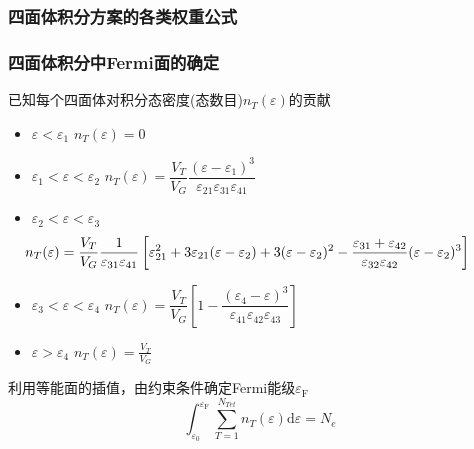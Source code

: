 \subsubsection{四面体积分方案的各类权重公式}
\frame
{
	\frametitle{四面体积分中\textrm{Fermi}面的确定}
	已知每个四面体对积分态密度(态数目)$n_T(\varepsilon)$的贡献
	\begin{itemize}
	\item $\varepsilon<\varepsilon_1$
		\:	$n_T(\varepsilon)=0$
	\item $\varepsilon_1<\varepsilon<\varepsilon_2$
		\:	$n_T(\varepsilon)=\dfrac{V_T}{V_G}\dfrac{(\varepsilon-\varepsilon_1)^3}{\varepsilon_{21}\varepsilon_{31}\varepsilon_{41}}$
	\item $\varepsilon_2<\varepsilon<\varepsilon_3$
		\begin{displaymath}
			\hspace*{-35pt}	n_T(\varepsilon)=\dfrac{V_T}{V_G}\dfrac1{\varepsilon_{31}\varepsilon_{41}}\left[\varepsilon_{21}^2+3\varepsilon_{21}(\varepsilon-\varepsilon_2)+3(\varepsilon-\varepsilon_2)^2-\dfrac{\varepsilon_{31}+\varepsilon_{42}}{\varepsilon_{32}\varepsilon_{42}}(\varepsilon-\varepsilon_2)^3\right]
		\end{displaymath}
	\item $\varepsilon_3<\varepsilon<\varepsilon_4$
		\:	$n_T(\varepsilon)=\dfrac{V_T}{V_G}\left[1-\dfrac{(\varepsilon_4-\varepsilon)^3}{\varepsilon_{41}\varepsilon_{42}\varepsilon_{43}}\right]$
	\item $\varepsilon>\varepsilon_4$
		\:	$n_T(\varepsilon)=\frac{V_T}{V_G}$
	\end{itemize}
	利用等能面的插值，由约束条件确定\textrm{Fermi}能级$\varepsilon_{\mathrm F}$
	$$\int_{\varepsilon_0}^{\varepsilon_{\mathrm F}}\sum_{T=1}^{N_{Tet}}n_T(\varepsilon)\mathrm{d}\varepsilon=N_e$$
}


